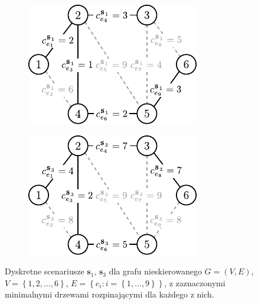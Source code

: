 \begin{figure}[!htbp]
	\null\hfill
	\begin{subfigure}[b]{0.35\textwidth}
		\includegraphics[width=\textwidth]{Chapter_II/MIN-MAX-DESC-example/a}
		\caption{}
		\label{fig:minmaxdesc:a}
	\end{subfigure}
	\hfill
	\begin{subfigure}[b]{0.35\textwidth}
		\includegraphics[width=\textwidth]{Chapter_II/MIN-MAX-DESC-example/b}
		\caption{}
		\label{fig:minmaxdesc:b}
	\end{subfigure}
	\hfill\null
	\caption{
		Dyskretne scenariusze $\textbf{s}_{1}$, $\textbf{s}_{3}$ dla grafu nieskierowanego $G = \left( V, E \right)$, $V = \left\{ 1, 2, \dots, 6 \right\}$, $E = \left\{ e_{i} : i = \left\{ 1, \dots, 9 \right\} \right\}$, z zaznaczonymi minimalnymi drzewami rozpinającymi dla każdego z nich.
	}
	\label{fig:minmaxdesc}
\end{figure}

